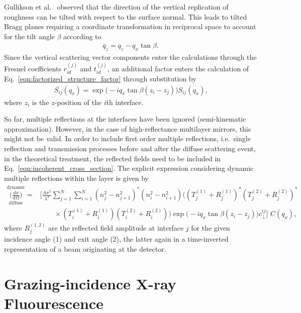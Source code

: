 Gullikson et al.~\cite{PhysRevB.59.13273} observed that the direction of the vertical replication of roughness can be tilted with respect to the surface normal. This leads to tilted Bragg planes requiring a coordinate transformation in reciprocal space to account for the tilt angle $\beta$ according to
\begin{align}
\overline{q}_z = q_z - q_x \tan \beta\text{.}
\end{align}
Since the vertical scattering vector components enter the calculations through the Fresnel coefficients $r_{id}^{(j)}$ and $t_{id}^{(j)}$, an additional factor enters the calculation of Eq.~\eqref{eqn:factorized_structure_factor} through substitution by
\begin{align}
\overline{S_{ij}}(q_x) = \exp\Big(-i q_x \tan \beta (z_i-z_j)\Big)  S_{ij}(q_x) \text{,} \label{eqn:tilt_correction}
\end{align}
where $z_i$ is the $z$-position of the $i$th interface.

So far, multiple reflections at the interfaces have been ignored (semi-kinematic approximation). However, in the case of high-reflectance multilayer mirrors, this might not be valid. In order to include first order multiple reflections, i.e.~single reflection and transmission processes before and after the diffuse scattering event, in the theoretical treatment, the reflected fields need to be included in Eq.~\eqref{eqn:incoherent_cross_section}. The explicit expression considering dynamic multiple reflections within the layer is given by
    \begin{align}
        \overset{\text{dynamic}}{\underset{\text{diffuse}}{\Big(\frac{d \sigma}{d \Omega}\Big)}} = &\Bigg[\frac{A \pi^2}{\lambda^4}\sum \limits_{j=1}^{N}\sum \limits_{i=1}^{N} (n_j^2 - n_{j+1}^2)^* (n_i^2 - n_{i+1}^2)\Big( (T^{(1)}_j + R^{(1)}_j)^* (T^{(2)}_j + R^{(2)}_j)^* \nonumber \\ &\qquad\times(T^{(1)}_i + R^{(1)}_i) (T^{(2)}_i + R^{(2)}_i) \Big) \exp\Big(-i q_x \tan \beta (z_i-z_j)\Big) c_\perp^{i j}\Bigg]\,\, C(q_x) \text{,} \label{eqn:multilayer_enhancement_factor}
    \end{align}
where $R^{(1,2)}_j$ are the reflected field amplitude at interface $j$ for the given incidence angle (1) and exit angle (2), the latter again in a time-inverted representation of a beam originating at the detector.

\section{Grazing-incidence X-ray Fluourescence}
